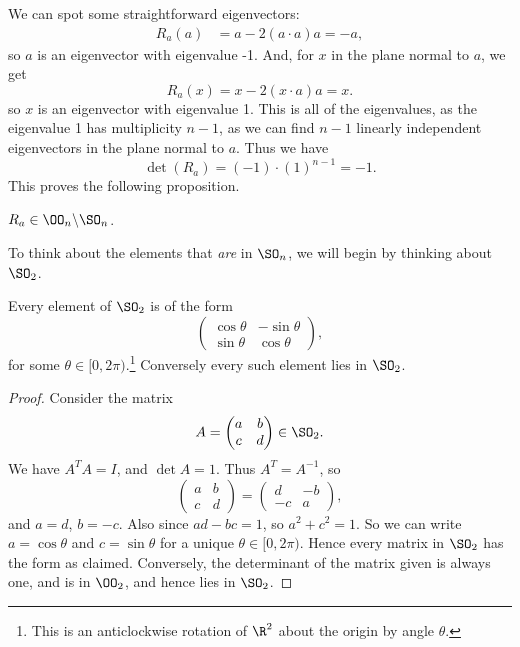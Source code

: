 We can spot some straightforward eigenvectors:
\begin{align*}
R_a(a) &= a - 2(a \cdot a)a = -a,
\end{align*}
so $a$ is an eigenvector with eigenvalue -1. And, for $x$ in the plane normal to $a$, we get
$$
R_a(x) = x - 2(x \cdot a) a = x.
$$
so $x$ is an eigenvector with eigenvalue 1. This is all of the eigenvalues, as the eigenvalue 1 has multiplicity $n - 1$, as we can find $n - 1$ linearly independent eigenvectors in the plane normal to $a$. Thus we have
$$
\det(R_a) = (-1) \cdot (1)^{n - 1} = -1.
$$
This proves the following proposition.
\begin{proposition}
	$R_a \in \OO_n \backslash \SO_n$.
\end{proposition}

To think about the elements that \emph{are} in $\SO_n$, we will begin by thinking about $\SO_2$.

\begin{theorem}[Elements of $\SO_2$]
	Every element of $\SO_2$ is of the form
	$$
	\begin{pmatrix}
		\cos \theta & - \sin \theta \\
		\sin \theta & \cos \theta
	\end{pmatrix},
	$$
	for some $\theta \in [0, 2 \pi)$.\footnote{This is an anticlockwise rotation of $\R^2$ about the origin by angle $\theta$.} Conversely every such element lies in $\SO_2$.
\end{theorem}
\begin{proof}
	Consider the matrix
	$$
A = \begin{pmatrix}
	a & b \\ c & d
\end{pmatrix} \in \SO_2.
	$$
	We have $A^T A = I$, and $\det A = 1$. Thus $A^T = A^{-1}$, so
	$$
	\begin{pmatrix}
		a & b \\ c & d
	\end{pmatrix} = \begin{pmatrix}
		d & -b \\ -c & a
	\end{pmatrix},
	$$
	and $a = d$, $b = -c$. Also since $ad - bc = 1$, so $a^2 + c^2 = 1$. So we can write $a = \cos \theta$ and $c = \sin \theta$ for a unique $\theta \in [0, 2\pi)$. Hence every matrix in $\SO_2$ has the form as claimed. Conversely, the determinant of the matrix given is always one, and is in $\OO_2$, and hence lies in $\SO_2$.
\end{proof}

